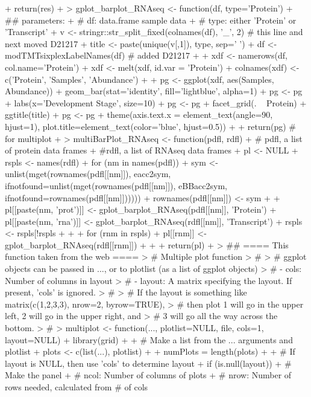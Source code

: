 \documentclass[a4paper]{article}
\begin{document}
\begin{Schunk}
\begin{Sinput}
{+     return(res)
+ }
> gplot_barplot_RNAseq <- function(df, type='Protein') {
+     ## parameters:
+     # df: data.frame sample data
+     # type: either 'Protein' or 'Transcript'
+     v <- stringr::str_split_fixed(colnames(df), '_', 2) # this line and next moved D21217
+     title <- paste(unique(v[,1]), type, sep=' ')
+     df <- modTMTsixplexLabelNames(df) # added D21217
+     
+     xdf <- namerows(df, col.name='Protein')
+     xdf <- melt(xdf, id.var = 'Protein')
+     colnames(xdf) <- c('Protein', 'Samples', 'Abundance')
+         
+     pg <- ggplot(xdf, aes(Samples, Abundance)) + geom_bar(stat='identity', fill='lightblue', alpha=1)
+     pg <- pg + labs(x='Development Stage', size=10)
+     pg <- pg + facet_grid(. ~ Protein) + ggtitle(title)
+     pg <- pg + theme(axis.text.x = element_text(angle=90, hjust=1), plot.title=element_text(color='blue', hjust=0.5))
+     
+     return(pg) # for multiplot
+ }
> multiBarPlot_RNAseq <- function(pdfl, rdfl) {
+     # pdfl, a list of protein data frames
+     #rdfl, a list of RNAseq data frames
+     pl <- NULL
+     rspls <- names(rdfl)
+     for (nm in names(pdfl)) {
+         sym <- unlist(mget(rownames(pdfl[[nm]]), eacc2sym, ifnotfound=unlist(mget(rownames(pdfl[[nm]]), eBBacc2sym, ifnotfound=rownames(pdfl[[nm]])))))
+         rownames(pdfl[[nm]]) <- sym
+ 
+         pl[[paste(nm, 'prot')]] <- gplot_barplot_RNAseq(pdfl[[nm]], 'Protein')
+         pl[[paste(nm, 'rna')]] <- gplot_barplot_RNAseq(rdfl[[nm]], 'Transcript')
+         rspls <- rspls[!rspls %in% nm]
+     }
+ 
+     for (rnm in rspls) {
+         pl[[rnm]] <- gplot_barplot_RNAseq(rdfl[[rnm]])
+     }
+ 
+     return(pl)
+ }
> ## ==== This function taken from the web ====
> # Multiple plot function
> #
> # ggplot objects can be passed in ..., or to plotlist (as a list of ggplot objects)
> # - cols:   Number of columns in layout
> # - layout: A matrix specifying the layout. If present, 'cols' is ignored.
> #
> # If the layout is something like matrix(c(1,2,3,3), nrow=2, byrow=TRUE),
> # then plot 1 will go in the upper left, 2 will go in the upper right, and
> # 3 will go all the way across the bottom.
> #
> multiplot <- function(..., plotlist=NULL, file, cols=1, layout=NULL) {
+     library(grid)
+ 
+     # Make a list from the ... arguments and plotlist
+     plots <- c(list(...), plotlist)
+ 
+     numPlots = length(plots)
+ 
+     # If layout is NULL, then use 'cols' to determine layout
+     if (is.null(layout)) {
+         # Make the panel
+         # ncol: Number of columns of plots
+         # nrow: Number of rows needed, calculated from # of cols
}}
\end{Sinput}
\end{Schunk}
\end{document}
